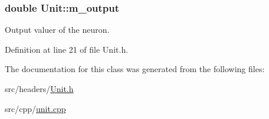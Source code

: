 \subsubsection[{\texorpdfstring{m\+\_\+output}{m_output}}]{\setlength{\rightskip}{0pt plus 5cm}double Unit\+::m\+\_\+output\hspace{0.3cm}{\ttfamily [private]}}\hypertarget{classUnit_a7866b2f28d164ca1f51229114dd8adfc}{}\label{classUnit_a7866b2f28d164ca1f51229114dd8adfc}


Output valuer of the neuron. 



Definition at line 21 of file Unit.\+h.



The documentation for this class was generated from the following files\+:\begin{DoxyCompactItemize}
\item 
src/headers/\hyperlink{Unit_8h}{Unit.\+h}\item 
src/cpp/\hyperlink{unit_8cpp}{unit.\+cpp}\end{DoxyCompactItemize}

